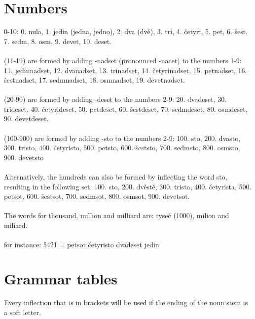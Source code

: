 \documentclass{article}
\begin{document}
\section*{Numbers}
0-10: 0. nula, 1. jedin (jedna, jedno), 2. dva (dvě), 3. tri, 4. četyri, 5. pet, 6. šest, 7. sedm, 8. osm, 9. devet, 10. deset.
\\ \\
(11-19) are formed by adding -nadset (pronounced -nacet) to the numbers 1-9: 11. jedinnadset, 12. dvanadset, 13. trinadset, 14. četyrinadset, 15. petnadset, 16. šestnadset, 17. sedmnadset, 18. osmnadset, 19. devetnadset.
\\ \\
(20-90) are formed by adding -deset to the numbers 2-9: 20. dvadeset, 30. trideset, 40. četyrideset, 50. petdeset, 60. šestdeset, 70. sedmdeset, 80. osmdeset, 90. devetdeset.
\\ \\
(100-900) are formed by adding -sto to the numbers 2-9: 100. sto, 200. dvasto, 300. tristo, 400. četyristo, 500. petsto, 600. šeststo, 700. sedmsto, 800. osmsto, 900. devetsto
\\ \\
Alternatively, the hundreds can also be formed by inflecting the word sto, resulting in the following set: 100. sto, 200. dvěstě, 300. trista, 400. četyrista, 500. petsot, 600. šestsot, 700. sedmsot, 800. osmsot, 900. devetsot.
\\ \\
The words for thousand, million and milliard are: tyseč (1000), milion and miliard. 
\\ \\
for instance: 5421 = petsot četyristo dvadeset jedin
\section{Grammar tables}
Every inflection that is in brackets will be used if the ending of the noun stem is a soft letter. 
\end{document}
